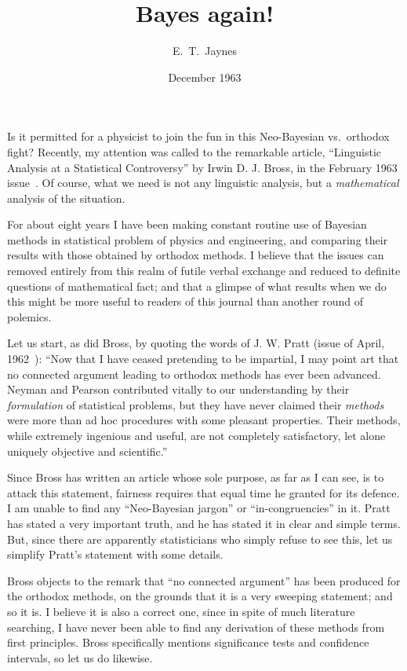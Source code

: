 \documentclass[12pt]{article}
\title{Bayes again!}
\author{E.~T.~Jaynes}
\date{December 1963}
\affil{Washington University, St.~Louis}
\let\oldcite\cite
\renewcommand{\cite}{~\oldcite}
\begin{document}
\maketitle

Is it permitted for a physicist to join the fun in this Neo-Bayesian
vs.~orthodox fight? Recently, my attention was called to the remarkable
article, ``Linguistic Analysis at a Statistical Controversy'' by Irwin D. J.
Bross, in the February 1963 issue\cite{bross}. Of course, what we need is not any
linguistic analysis, but a \emph{mathematical} analysis of the situation.

For about eight years I have been making constant routine use of
Bayesian methods in statistical problem of physics and engineering,
and comparing their results with those obtained by orthodox methods. I
believe that the issues can removed entirely from this realm of
futile verbal exchange and reduced to definite questions of mathematical
fact; and that a glimpse of what results when we do this might be more
useful to readers of this journal than another round of polemics.

Let us start, as did Bross, by quoting the words of J. W. Pratt
(issue of April, 1962\cite{pratt}): ``Now that I have ceased pretending to be
impartial, I may point art that no connected argument leading to
orthodox methods has ever been advanced. Neyman and Pearson contributed
vitally to our understanding by their \emph{formulation} of statistical
problems, but they have never claimed their \emph{methods} were more than
ad hoc procedures with some pleasant properties. Their methods, while
extremely ingenious and useful, are not completely satisfactory, let alone
uniquely objective and scientific.''

Since Bross has written an article whose sole purpose, as far
as I can see, is to attack this statement, fairness requires that equal
time he granted for its defence. I am unable to find any ``Neo-Bayesian
jargon'' or ``in-congruencies'' in it. Pratt has stated a very important
truth, and he has stated it in clear and simple terms. But, since there
are apparently statisticians who simply refuse to see this, let us
simplify Pratt's statement with some details.

Bross objects to the remark that ``no connected argument'' has been
produced for the orthodox methods, on the grounds that it is a very sweeping statement; and so it is.
I believe it is also a correct one,
since in spite of much literature searching, I have never been able
to find any derivation of these methods from first principles. Bross
specifically mentions significance tests and confidence intervals, so
let us do likewise.
\end{document}
